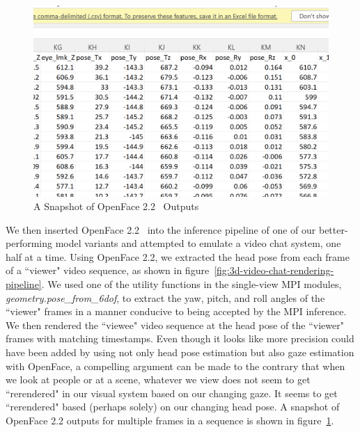 \begin{figure}[!h]
    \includegraphics[width=0.75\columnwidth]{figures/openface-csv.png}
    \caption{A Snapshot of OpenFace 2.2~\cite{baltrusaitis_openface_2018} Outputs}
    \label{fig:openface-outputs}
\end{figure}

We then inserted OpenFace 2.2~\cite{baltrusaitis_openface_2018} into the inference pipeline of one of our better-performing model variants and attempted to emulate a video chat system, one half at a time. Using OpenFace 2.2, we extracted the head pose from each frame of a ``viewer" video sequence, as shown in figure~\ref{fig:3d-video-chat-rendering-pipeline}. We used one of the utility functions in the single-view MPI modules, \textit{geometry.pose\_from\_6dof}, to extract the yaw, pitch, and roll angles of the ``viewer" frames in a manner conducive to being accepted by the MPI inference. We then rendered the ``viewee" video sequence at the head pose of the ``viewer" frames with matching timestamps. Even though it looks like more precision could have been added by using not only head pose estimation but also gaze estimation with OpenFace, a compelling argument can be made to the contrary that when we look at people or at a scene, whatever we view does not seem to get ``rerendered" in our visual system based on our changing gaze. It seems to get ``rerendered" based (perhaps solely) on our changing head pose. A snapshot of OpenFace 2.2 outputs for multiple frames in a sequence is shown in figure~\ref{fig:openface-outputs}.